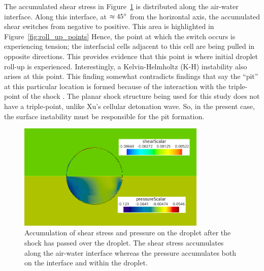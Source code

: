 \documentclass{UCF_ETD}
\begin{document}
The accumulated shear stress in Figure~\ref{fig:shear_pressure_accumulation} is distributed along the air-water interface.
Along this interface, at $\approx 45 \degree$ from the horizontal axis, the accumulated shear switches from negative to positive. This area is highlighted in Figure~\ref{fig:roll_up_points}
Hence, the point at which the switch occurs is experiencing tension; the interfacial cells adjacent to this cell are being pulled in opposite directions.
This provides evidence that this point is where initial droplet roll-up is experienced.
Interestingly, a Kelvin-Helmholtz (K-H) instability also arises at this point.
This finding somewhat contradicts findings that say the ``pit''  at this particular location is formed because of the interaction with the triple-point of the shock \cite{Xu2024}.
The planar shock structure being used for this study does not have a triple-point, unlike Xu's cellular detonation wave. So, in the present case, the surface instability must be responsible for the pit formation.


\begin{figure}
    \centering
    \includegraphics[width=0.8\textwidth]{Figures/pressure_and_shear_accumulation.png}
    \caption{Accumulation of shear stress and pressure on the droplet after the shock has passed over the droplet. The shear stress accumulates along the air-water interface whereas the pressure accumulates both on the interface and within the droplet.}
    \label{fig:shear_pressure_accumulation}
\end{figure}
\end{document}
